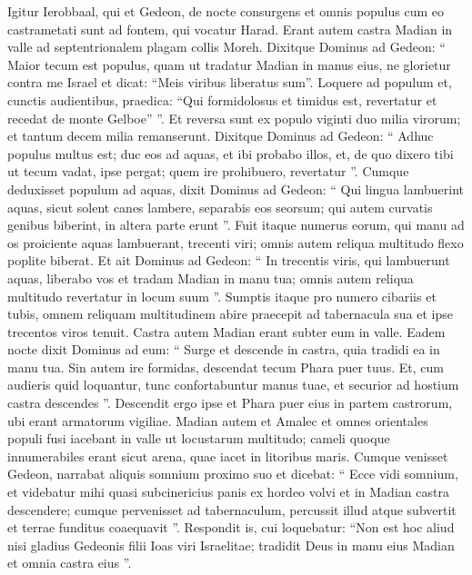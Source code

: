 \begin{biblechapter}
\begin{biblechapter}
\begin{biblechapter}
\begin{biblechapter}
\begin{biblechapter}
\begin{biblechapter}
\begin{biblechapter}
\verse Igitur Ierobbaal, qui et Gedeon, de nocte consurgens et omnis populus cum eo castrametati sunt ad fontem, qui vocatur Harad. Erant autem castra Madian in valle ad septentrionalem plagam collis Moreh.
 \verse Dixitque Dominus ad Gedeon: “ Maior tecum est populus, quam ut tradatur Madian in manus eius, ne glorietur contra me Israel et dicat: “Meis viribus liberatus sum”. 
\verse Loquere ad populum et, cunctis audientibus, praedica: “Qui formidolosus et timidus est, revertatur et recedat de monte Gelboe” ”. Et reversa sunt ex populo viginti duo milia virorum; et tantum decem milia remanserunt.
 \verse Dixitque Dominus ad Gedeon: “ Adhuc populus multus est; duc eos ad aquas, et ibi probabo illos, et, de quo dixero tibi ut tecum vadat, ipse pergat; quem ire prohibuero, revertatur ”. 
\verse Cumque deduxisset populum ad aquas, dixit Dominus ad Gedeon: “ Qui lingua lambuerint aquas, sicut solent canes lambere, separabis eos seorsum; qui autem curvatis genibus biberint, in altera parte erunt ”. 
\verse Fuit itaque numerus eorum, qui manu ad os proiciente aquas lambuerant, trecenti viri; omnis autem reliqua multitudo flexo poplite biberat. 
\verse Et ait Dominus ad Gedeon: “ In trecentis viris, qui lambuerunt aquas, liberabo vos et tradam Madian in manu tua; omnis autem reliqua multitudo revertatur in locum suum ”. 
\verse Sumptis itaque pro numero cibariis et tubis, omnem reliquam multitudinem abire praecepit ad tabernacula sua et ipse trecentos viros tenuit. Castra autem Madian erant subter eum in valle.
 \verse Eadem nocte dixit Dominus ad eum: “ Surge et descende in castra, quia tradidi ea in manu tua. 
\verse Sin autem ire formidas, descendat tecum Phara puer tuus. 
 \verse Et, cum audieris quid loquantur, tunc confortabuntur manus tuae, et securior ad hostium castra descendes ”. Descendit ergo ipse et Phara puer eius in partem castrorum, ubi erant armatorum vigiliae. 
\verse Madian autem et Amalec et omnes orientales populi fusi iacebant in valle ut locustarum multitudo; cameli quoque innumerabiles erant sicut arena, quae iacet in litoribus maris.
 \verse Cumque venisset Gedeon, narrabat aliquis somnium proximo suo et dicebat: “ Ecce vidi somnium, et videbatur mihi quasi subcinericius panis ex hordeo volvi et in Madian castra descendere; cumque pervenisset ad tabernaculum, percussit illud atque subvertit et terrae funditus coaequavit ”. 
\verse Respondit is, cui loquebatur: “Non est hoc aliud nisi gladius Gedeonis filii Ioas viri Israelitae; tradidit Deus in manu eius Madian et omnia castra eius ”.

\end{biblechapter}
\end{biblechapter}
\end{biblechapter}
\end{biblechapter}
\end{biblechapter}
\end{biblechapter}
\end{biblechapter}
